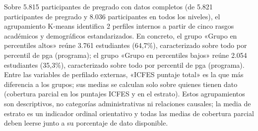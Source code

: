 Sobre 5.815 participantes de pregrado con datos completos (de 5.821 participantes de pregrado y 8.036 participantes en todos los niveles), el agrupamiento K-means identifica 2 perfiles internos a partir de cinco rasgos académicos y demográficos estandarizados. En concreto, el grupo «Grupo en percentiles altos» reúne 3.761 estudiantes (64,7\%), caracterizado sobre todo por percentil de pga (programa); el grupo «Grupo en percentiles bajos» reúne 2.054 estudiantes (35,3\%), caracterizado sobre todo por percentil de pga (programa). Entre las variables de perfilado externas, «ICFES puntaje total» es la que más diferencia a los grupos; sus medias se calculan solo sobre quienes tienen dato (cobertura parcial en los puntajes ICFES y en el estrato). Estos agrupamientos son descriptivos, no categorías administrativas ni relaciones causales; la media de estrato es un indicador ordinal orientativo y todas las medias de cobertura parcial deben leerse junto a su porcentaje de dato disponible.
